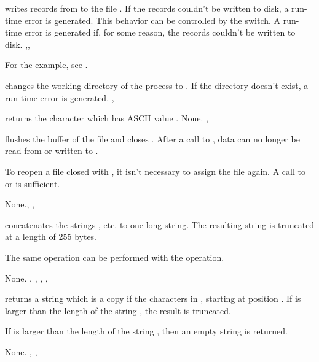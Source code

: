 \documentclass{report}
\begin{document}
{ writes  records from  to the file
 . 
If the records couldn't be written to disk, a run-time error is generated.
This behavior can be controlled by the  switch. 
}
{A run-time error is generated if, for some reason, the records couldn't be
written to disk.}
{,, }

For the example, see .

{ changes the working directory of the process to .}
{If the directory  doesn't exist, a run-time error is generated.}
{, }



{ returns the character which has ASCII value .}
{None.}
{,}



{ flushes the buffer of the file  and closes .
After a call to , data can no longer be read from or written to
.

To reopen a file closed with , it isn't necessary to assign the
file again. A call to  or  is sufficient.}
{None.}{, , }



{ concatenates the strings , etc. to one long
string. The resulting string is truncated at a length of 255 bytes.

The same operation can be performed with the \var{+} operation.}
{None.}
{, , , , }



{ returns a string which is a copy if the  characters
in , starting at position . If  is larger than
the length of the string , the result is truncated. 

If  is larger than the length of the string , then an
empty string is returned.}
{None.}
{, , }
\end{document}
